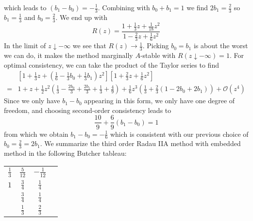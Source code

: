\documentclass[10pt,a4paper]{article}
\newcommand{\half}[0]{\frac{1}{2}}
\begin{document}
which leads to $(b_1 - b_0) = -\frac{1}{3}.$ Combining with $b_0+b_1=1$ we find $2b_1 = \frac{2}{3}$ so $b_1=\frac{1}{3}$ and $b_0 = \frac{2}{3}.$ We end up with
\begin{equation*}
  R(z) = \frac{1 + \frac{1}{3}z + \frac{1}{18}z^2}{1 - \frac{2}{3}z + \frac{1}{6}z^2}
\end{equation*}
In the limit of $z \downarrow -\infty$ we see that $R(z) \rightarrow \frac{1}{3}.$
Picking $b_0=b_1$ is about the worst we can do, it makes the method marginally $A$-stable with $R(z\downarrow -\infty)=1.$
For optimal consistency, we can take the product of the Taylor series to find
\begin{align*}
  &\left[1 + \frac{1}{3}z + \left(\frac{1}{6} - \frac{1}{3}b_0 + \frac{1}{3}b_1\right)z^2\right]\left[1 + \frac{2}{3}z + \frac{1}{6}z^2\right] \\
  =& 1 + z + \half z^2\left(\frac{1}{3} - \frac{2b_0}{3} + \frac{2b_1}{3} + \frac{1}{3} + \frac{4}{9}\right) + \frac{1}{6}z^3 \left(\frac{1}{3}  + \frac{2}{3}\left(1 - 2b_0 + 2b_1\right)\right)  + \mathcal{O}(z^4)
\end{align*}
Since we only have $b_1-b_0$ appearing in this form, we only have one degree of freedom, and choosing second-order consistency leads to
\begin{equation*}
  \frac{10}{9} + \frac{6}{9}(b_1-b_0) = 1
\end{equation*}
from which we obtain $b_1-b_0 = -\frac{1}{6}$ which is consistent with our previous choice of $b_0 = \frac{2}{3} = 2b_1.$
We summarize the third order Radau IIA method with embedded method in the following Butcher tableau:
\begin{table}[h]
  \centering
  \begin{tabular}{c|ccc}
    $\frac{1}{3}$ & $\frac{5}{12}$ & $-\frac{1}{12} $ \\
    $1$ & $\frac{3}{4}$ & $\frac{1}{4}$ \\ \hline
    {} & $\frac{3}{4}$ & $\frac{1}{4}$ \\
    {} & $\frac{1}{3}$ & $\frac{2}{3}$
  \end{tabular}
\end{table}

\clearpage{}
\end{document}
